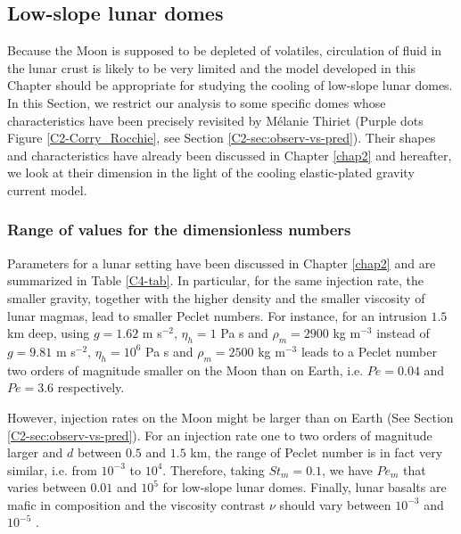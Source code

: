 \subsection{Low-slope lunar domes}
\label{sec:appl-arrest-terr-1}

Because the Moon is supposed  to be depleted of volatiles, circulation
of fluid in the lunar crust is likely to be very limited and the model
developed  in this  Chapter  should be  appropriate  for studying  the
cooling of  low-slope lunar domes.   In this Section, we  restrict our
analysis  to  some  specific  domes whose  characteristics  have  been
precisely   revisited  by   Mélanie   Thiriet   (Purple  dots   Figure
\ref{C2-Corry_Rocchie},   see  Section   \ref{C2-sec:observ-vs-pred}).
Their  shapes  and  characteristics  have already  been  discussed  in
Chapter \ref{chap2} and  hereafter, we look at their  dimension in the
light of the cooling elastic-plated gravity current model.

\subsubsection*{Range of values for the dimensionless numbers}
\label{C4-sec:range-valu-dimens-gr}

Parameters  for  a  lunar  setting  have  been  discussed  in  Chapter
\ref{chap2} and are summarized  in Table \ref{C4-tab}.  In particular,
for the  same injection rate,  the smaller gravity, together  with the
higher  density and  the smaller  viscosity of  lunar magmas,  lead to
smaller Peclet numbers.  For instance, for an intrusion $1.5$ km deep,
using  $g=1.62$  m s$^{-2}$,  $\eta_h=1$  Pa  s and  $\rho_m=2900$  kg
m$^{-3}$  instead  of $g=9.81$  m  s$^{-2}$,  $\eta_h=10^6$ Pa  s  and
$\rho_m=2500$  kg m$^{-3}$  leads  to  a Peclet  number  two orders  of
magnitude  smaller on  the Moon  than  on Earth,  i.e.  $Pe=0.04$  and
$Pe=3.6$ respectively.  

However, injection  rates on the  Moon might  be larger than  on Earth
\citep{Crisp:1990gf,Zimbelman:1998ww}           (See           Section
\ref{C2-sec:observ-vs-pred}).  For an injection rate one to two orders
of magnitude larger  and $d$ between $0.5$ and $1.5$  km, the range of
Peclet number is in fact very similar, i.e.  from $10^{-3}$ to $10^4$.
Therefore,  taking  $St_m=0.1$, we  have  $Pe_m$  that varies  between
$0.01$ and $10^5$  for low-slope lunar domes.   Finally, lunar basalts
are mafic in composition and  the viscosity contrast $\nu$ should vary
between $10^{-3}$ and $10^{-5}$ \citep{Diniega:2013eh}.

